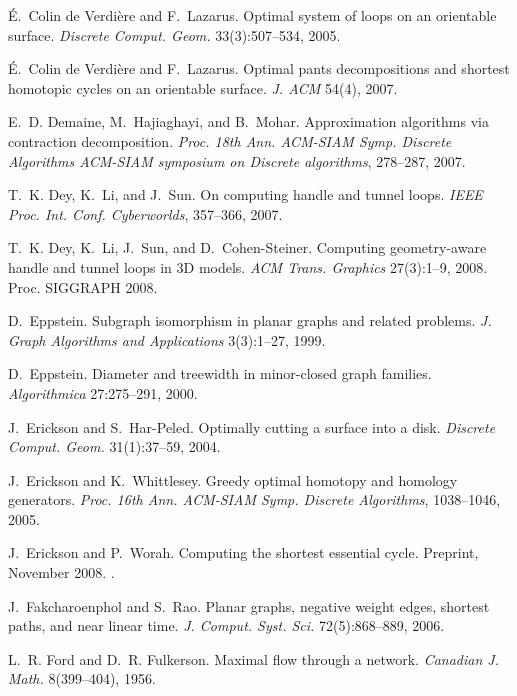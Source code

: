 \begin{thebibliography}{10}
{\'E}.~{Colin de Verdi{\`e}re} and F.~Lazarus.
\newblock Optimal system of loops on an orientable surface.
\newblock \emph{Discrete Comput. Geom.} 33(3):507--534, 2005.

{\'E}.~{Colin de Verdi{\`e}re} and F.~Lazarus.
\newblock Optimal pants decompositions and shortest homotopic cycles on an
  orientable surface.
\newblock \emph{J. ACM} 54(4), 2007.

E.~D. Demaine, M.~Hajiaghayi, and B.~Mohar.
\newblock Approximation algorithms via contraction decomposition.
\newblock \emph{Proc. 18th Ann. ACM-SIAM Symp. Discrete Algorithms ACM-SIAM
  symposium on Discrete algorithms}, 278--287, 2007.

T.~K. Dey, K.~Li, and J.~Sun.
\newblock On computing handle and tunnel loops.
\newblock \emph{IEEE Proc. Int. Conf. Cyberworlds}, 357--366, 2007.

T.~K. Dey, K.~Li, J.~Sun, and D.~Cohen-Steiner.
\newblock Computing geometry-aware handle and tunnel loops in {3D} models.
\newblock \emph{ACM Trans. Graphics} 27(3):1--9, 2008.
\newblock Proc. SIGGRAPH 2008.

D.~Eppstein.
\newblock Subgraph isomorphism in planar graphs and related problems.
\newblock \emph{J. Graph Algorithms and Applications} 3(3):1--27, 1999.

D.~Eppstein.
\newblock Diameter and treewidth in minor-closed graph families.
\newblock \emph{Algorithmica} 27:275--291, 2000.

J.~Erickson and S.~Har-Peled.
\newblock Optimally cutting a surface into a disk.
\newblock \emph{Discrete Comput. Geom.} 31(1):37--59, 2004.

J.~Erickson and K.~Whittlesey.
\newblock Greedy optimal homotopy and homology generators.
\newblock \emph{Proc. 16th Ann. ACM-SIAM Symp. Discrete Algorithms},
  1038--1046, 2005.

J.~Erickson and P.~Worah.
\newblock Computing the shortest essential cycle.
\newblock Preprint, November 2008.
\newblock {}.

J.~Fakcharoenphol and S.~Rao.
\newblock Planar graphs, negative weight edges, shortest paths, and near linear
  time.
\newblock \emph{J. Comput. Syst. Sci.} 72(5):868--889, 2006.

L.~R. Ford and D.~R. Fulkerson.
\newblock Maximal flow through a network.
\newblock \emph{Canadian J. Math.} 8(399--404), 1956.


\end{thebibliography}
